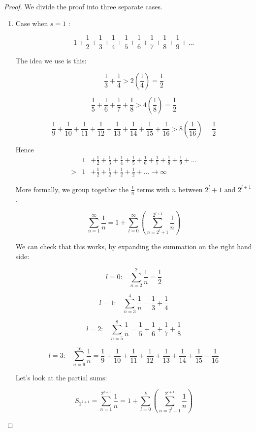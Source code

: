 \documentclass[12pt]{scrbook}
\begin{document}
\begin{proof}

We divide the proof into three separate cases.
\begin{enumerate}
\item Case when $s = 1$ :

\[ 1 + \frac{1}{2} + \frac{1}{3} +\frac{1}{4} + \frac{1}{5} +
\frac{1}{6} + \frac{1}{7} + \frac{1}{8} + \frac{1}{9} + \ldots \]

The idea we use is this:

\[ \frac{1}{3} +  \frac{1}{4}  > 2\left( \frac{1}{4} \right)  = \frac{1}{2}  \]

\[ \frac{1}{5} + \frac{1}{6} + \frac{1}{7} + \frac{1}{8} > 4\left( \frac{1}{8} \right)  = \frac{1}{2}  \]

\[ \frac{1}{9} + \frac{1}{10} + \frac{1}{11}+ \frac{1}{12} +
\frac{1}{13} + \frac{1}{14} + \frac{1}{15} + \frac{1}{16 }> 8\left( \frac{1}{16} \right)  =
\frac{1}{2}  \]

Hence
\begin{eqnarray*}
&1& + \frac{1}{2} + \frac{1}{3} +\frac{1}{4} + \frac{1}{5} + \frac{1}{6} + \frac{1}{7} + \frac{1}{8} + \frac{1}{9} + \ldots \\
> &1& + \frac{1}{2} +  \frac{1}{2} + \frac{1}{2} + \frac{1}{2} + \ldots \rightarrow \infty 
\end{eqnarray*}

More formally, we group together the $\frac{1}{n}$ terms with $n$ between $2^{l} + 1$ and $2^{l+1}$.

\[ \sum_{n=1}^{\infty} \frac{1}{n} = 1 + \sum_{l=0}^{\infty} \left( \sum_{n=2^{l} + 1}^{2^{l+1}} \frac{1}{n} \right) \]

We can check that this works, by expanding the summation on the right hand side:

\[ l = 0: \;\;\;  \sum_{n=2}^{2} \frac{1}{n}  = \frac{1}{2} \]

\[ l = 1: \;\;\; \sum_{n=3}^{4} \frac{1}{n}  =\frac{1}{3} + \frac{1}{4} \]

\[ l = 2: \;\;\; \sum_{n=5}^{8} \frac{1}{n}  =\frac{1}{5} +\frac{1}{6} +  \frac{1}{7} + \frac{1}{8} \]

\[ l = 3: \;\;\; \sum_{n=9}^{16} \frac{1}{n}  =\frac{1}{9} +\frac{1}{10} +  \frac{1}{11} + \frac{1}{12} 
+ \frac{1}{13} + \frac{1}{14} + \frac{1}{15} + \frac{1}{16}  \]

Let's look at the partial sums:

\[ S_{2^{k+1}} = \sum_{n=1}^{2^{k+1}} \frac{1}{n}  = 1 + \sum_{l=0}^{k}\left( \sum_{n=2^l + 1}^{2^{l+1}} \frac{1}{n}  \right) \]


\end{enumerate}
\end{proof}
\end{document}
